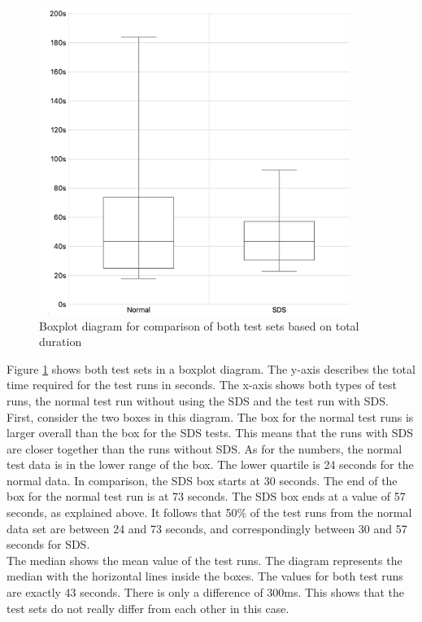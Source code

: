 \begin{figure}[htbp]
    \centerline{
    \includegraphics[height=10cm]{images/box_plot_total_duration.png}}
\caption{Boxplot diagram for comparison of both test sets based on total duration}
\label{box_plot_comparison}
\end{figure}
Figure \ref{box_plot_comparison} shows both test sets in a boxplot diagram. The y-axis describes the total time required for the test runs in seconds. The x-axis shows both types of test runs, the normal test run without using the \ac{SDS} and the test run with \ac{SDS}. \\
First, consider the two boxes in this diagram. The box for the normal test runs is larger overall than the box for the \ac{SDS} tests. This means that the runs with \ac{SDS} are closer together than the runs without \ac{SDS}. As for the numbers, the normal test data is in the lower range of the box. The lower quartile is 24 seconds for the normal data. In comparison, the \ac{SDS} box starts at 30 seconds. The end of the box for the normal test run is at 73 seconds. The \ac{SDS} box ends at a value of 57 seconds, as explained above. It follows that 50\% of the test runs from the normal data set are between 24 and 73 seconds, and correspondingly between 30 and 57 seconds for \ac{SDS}. \\
The median shows the mean value of the test runs. The diagram represents the median with the horizontal lines inside the boxes. The values for both test runs are exactly 43 seconds. There is only a difference of 300ms. This shows that the test sets do not really differ from each other in this case. \\
